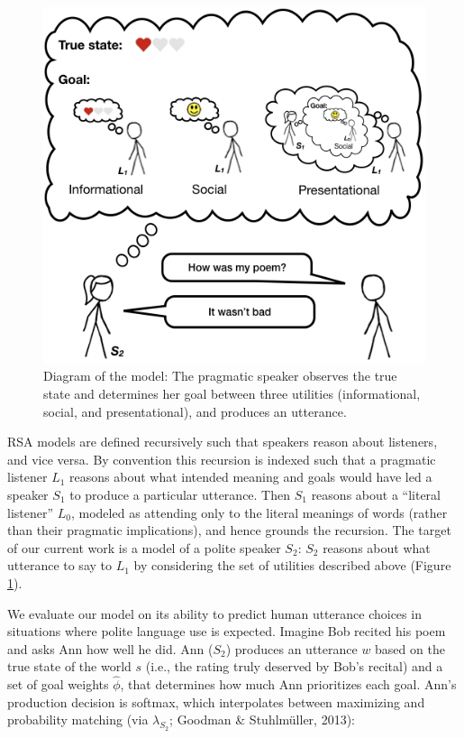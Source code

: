 \documentclass[floatsintext,man]{apa6}
\theoremstyle{definition}
\theoremstyle{definition}
\theoremstyle{definition}
\theoremstyle{remark}
\begin{document}
\begin{figure}[!h]
\includegraphics[width=\textwidth]{fig/model} \caption{Diagram of the model: The pragmatic speaker observes the true state and determines her goal between three utilities (informational, social, and presentational), and produces an utterance.}\label{fig:model}
\end{figure}

RSA models are defined recursively such that speakers reason about
listeners, and vice versa. By convention this recursion is indexed such
that a pragmatic listener \(L_1\) reasons about what intended meaning
and goals would have led a speaker \(S_1\) to produce a particular
utterance. Then \(S_1\) reasons about a \enquote{literal listener}
\(L_0\), modeled as attending only to the literal meanings of words
(rather than their pragmatic implications), and hence grounds the
recursion. The target of our current work is a model of a polite speaker
\(S_2\): \(S_2\) reasons about what utterance to say to \(L_1\) by
considering the set of utilities described above (Figure
\ref{fig:model}).

We evaluate our model on its ability to predict human utterance choices
in situations where polite language use is expected. Imagine Bob recited
his poem and asks Ann how well he did. Ann (\(S_2\)) produces an
utterance \(w\) based on the true state of the world \(s\) (i.e., the
rating truly deserved by Bob's recital) and a set of goal weights
\(\hat{\phi}\), that determines how much Ann prioritizes each goal.
Ann's production decision is softmax, which interpolates between
maximizing and probability matching (via \(\lambda_{S_2}\); Goodman \&
Stuhlmüller, 2013):
\end{document}
